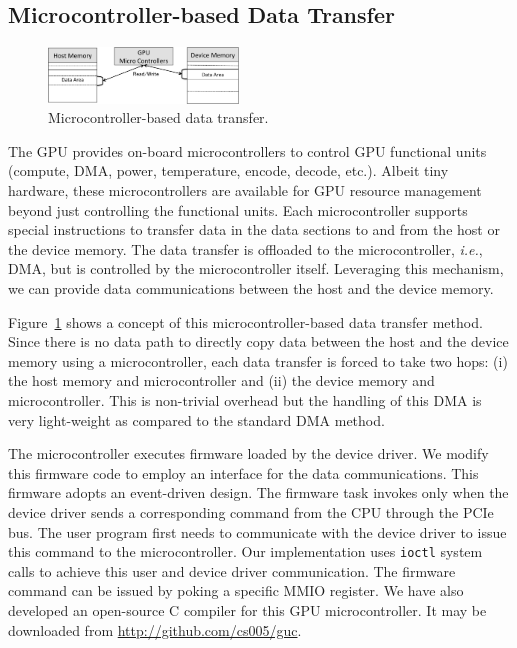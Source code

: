 \subsection{Microcontroller-based Data Transfer}
\label{sec:micro}

\begin{figure}[!t]
 \centering
 \includegraphics[width=0.45\textwidth]{figure/Method/Micro_Method.pdf}
 \caption{Microcontroller-based data transfer.}
 \label{fig:micro}
\end{figure}

The GPU provides on-board microcontrollers to control GPU functional
units (compute, DMA, power, temperature, encode, decode, etc.).
Albeit tiny hardware, these microcontrollers are available for GPU
resource management beyond just controlling the functional units.
Each microcontroller supports special instructions to transfer data in
the data sections to and from the host or the device memory.
The data transfer is offloaded to the microcontroller, \textit{i.e.},
DMA, but is controlled by the microcontroller itself.
Leveraging this mechanism, we can provide data communications between
the host and the device memory.

Figure~\ref{fig:micro} shows a concept of this microcontroller-based
data transfer method.
Since there is no data path to directly copy data between the host and
the device memory using a microcontroller, each data transfer is forced
to take two hops: (i) the host memory and microcontroller and (ii) the
device memory and microcontroller.
This is non-trivial overhead but the handling of this DMA is very
light-weight as compared to the standard DMA method.

The microcontroller executes firmware loaded by the device driver.
We modify this firmware code to employ an interface for the data
communications.
This firmware adopts an event-driven design.
The firmware task invokes only when the device driver sends a
corresponding command from the CPU through the PCIe bus.
The user program first needs to communicate with the device driver
to issue this command to the microcontroller.
Our implementation uses \texttt{ioctl} system calls to achieve this user
and device driver communication.
The firmware command can be issued by poking a specific MMIO register.
We have also developed an open-source C compiler for this GPU
microcontroller.
It may be downloaded from \url{http://github.com/cs005/guc}.

